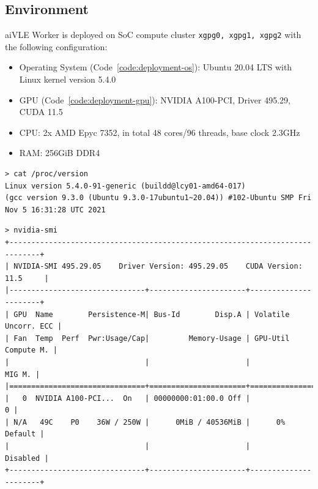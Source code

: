 \subsection{Environment}
\label{ss:deployment-environment}
aiVLE Worker is deployed on SoC compute cluster \texttt{xgpg0, xgpg1, xgpg2} with the following configuration:
\begin{itemize}
    \item Operating System (Code~\ref{code:deployment-os}): Ubuntu 20.04 LTS with Linux kernel version 5.4.0
    \item GPU (Code~\ref{code:deployment-gpu}): NVIDIA A100-PCI, Driver 495.29, CUDA 11.5
    \item CPU: 2x AMD Epyc 7352, in total 48 cores/96 threads, base clock 2.3GHz
    \item RAM: 256GiB DDR4
\end{itemize}

\begin{code}
\begin{verbatim}
> cat /proc/version
Linux version 5.4.0-91-generic (buildd@lcy01-amd64-017) 
(gcc version 9.3.0 (Ubuntu 9.3.0-17ubuntu1~20.04)) #102-Ubuntu SMP Fri Nov 5 16:31:28 UTC 2021
\end{verbatim}
\label{code:deployment-os}
\end{code}

\begin{code}
\begin{verbatim}
> nvidia-smi
+-----------------------------------------------------------------------------+
| NVIDIA-SMI 495.29.05    Driver Version: 495.29.05    CUDA Version: 11.5     |
|-------------------------------+----------------------+----------------------+
| GPU  Name        Persistence-M| Bus-Id        Disp.A | Volatile Uncorr. ECC |
| Fan  Temp  Perf  Pwr:Usage/Cap|         Memory-Usage | GPU-Util  Compute M. |
|                               |                      |               MIG M. |
|===============================+======================+======================|
|   0  NVIDIA A100-PCI...  On   | 00000000:01:00.0 Off |                    0 |
| N/A   49C    P0    36W / 250W |      0MiB / 40536MiB |      0%      Default |
|                               |                      |             Disabled |
+-------------------------------+----------------------+----------------------+
\end{verbatim}
\label{code:deployment-gpu}
\end{code}

